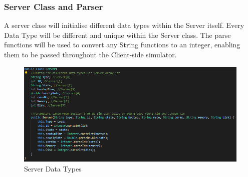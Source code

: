 \documentclass[a4paper]{article} %
\begin{document}
\subsubsection{Server Class and Parser}
A server class will initialise different data types within the Server itself. Every Data Type will be different and unique within the Server class. The parse functions \cite{parse} will be used to convert any String functions to an integer, enabling them to be passed throughout the Client-side simulator.


\begin{figure}[H]
\begin{center}
\includegraphics[scale=0.5]{Server.java.png}
\caption{Server Data Types}
\end{center}
\end{figure}






\printbibliography

\end{document}
